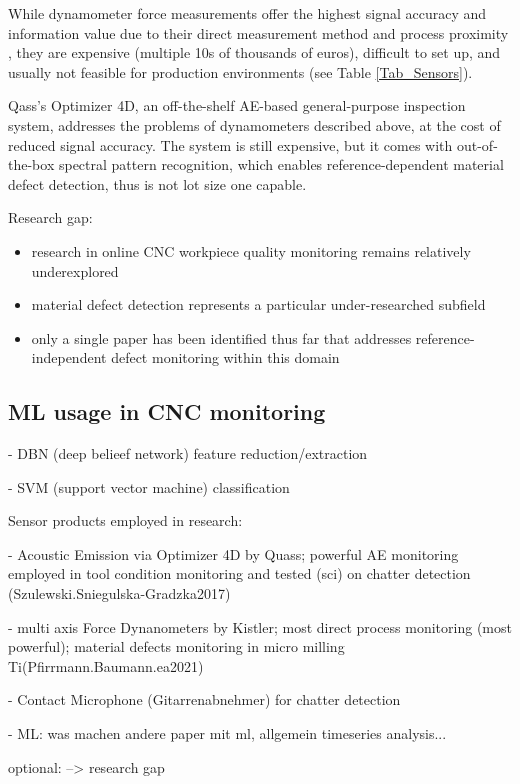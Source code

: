 \documentclass[5p,times,procedia]{elsarticle}
\newenvironment{note}{%
	\noindent
    \color{notecolor}%
}{%
    \par\medskip%
}
\begin{document}
While dynamometer force measurements offer the highest signal accuracy and information value due to their direct measurement method and process proximity \cite[]{Korkmaz.Yasar.ea2020}, they are expensive (multiple 10s of thousands of euros), difficult to set up, and usually not feasible for production environments (see Table \ref{Tab_Sensors}).

Qass's Optimizer 4D, an off-the-shelf AE-based general-purpose inspection system, addresses the problems of dynamometers described above, at the cost of reduced signal accuracy. The system is still expensive, but it comes with out-of-the-box spectral pattern recognition, which enables reference-dependent material defect detection, thus is not lot size one capable. \cite[p.5]{Szulewski.Sniegulska-Gradzka2017}

\vspace*{.5\baselineskip}
\noindent Research gap:\label{gap}
\vspace*{-\baselineskip}
\begin{itemize}
	\item research in online CNC workpiece quality monitoring remains relatively underexplored
	\item material defect detection represents a particular under-researched subfield
	\item only a single paper has been identified thus far that addresses reference-independent defect monitoring within this domain
\end{itemize}

\subsection{ML usage in CNC monitoring}
\vspace*{-\baselineskip}
- DBN (deep belieef network) feature reduction/extraction

- SVM (support vector machine) classification




\begin{note}
Sensor products employed in research:

- Acoustic Emission via Optimizer 4D by Quass; powerful AE monitoring employed in tool condition monitoring and tested (sci) on chatter detection (Szulewski.Sniegulska-Gradzka2017)

- multi axis Force Dynanometers by Kistler; most direct process monitoring (most powerful); material defects monitoring in micro milling Ti(Pfirrmann.Baumann.ea2021)

- Contact Microphone (Gitarrenabnehmer) for chatter detection

- ML: was machen andere paper mit ml, allgemein timeseries analysis...

optional: --> research gap
\end{note}
\end{document}
